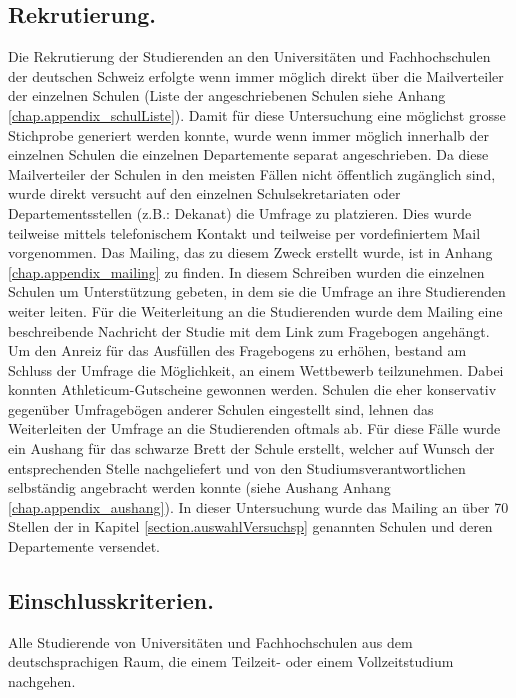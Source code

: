 \subsection{Rekrutierung.}\label{subsection.rekrutierung}
Die Rekrutierung der Studierenden an den Universitäten und Fachhochschulen der deutschen Schweiz erfolgte wenn immer möglich direkt über die Mailverteiler der einzelnen Schulen (Liste der angeschriebenen Schulen siehe Anhang \ref{chap.appendix_schulListe}). Damit für diese Untersuchung eine möglichst grosse Stichprobe generiert werden konnte, wurde wenn immer möglich innerhalb der einzelnen Schulen die einzelnen Departemente separat angeschrieben. Da diese Mailverteiler der Schulen in den meisten Fällen nicht öffentlich zugänglich sind, wurde direkt versucht auf den einzelnen Schulsekretariaten oder Departementsstellen (z.B.: Dekanat) die Umfrage zu platzieren. Dies wurde teilweise mittels telefonischem Kontakt und teilweise per vordefiniertem Mail vorgenommen. Das Mailing, das zu diesem Zweck erstellt wurde, ist in Anhang \ref{chap.appendix_mailing} zu finden. In diesem Schreiben wurden die einzelnen Schulen um Unterstützung gebeten, in dem sie die Umfrage an ihre Studierenden weiter leiten. Für die Weiterleitung an die Studierenden wurde dem Mailing eine beschreibende Nachricht der Studie mit dem Link zum Fragebogen angehängt. Um den Anreiz für das Ausfüllen des Fragebogens zu erhöhen, bestand am Schluss der Umfrage die Möglichkeit, an einem Wettbewerb teilzunehmen. Dabei konnten Athleticum-Gutscheine gewonnen werden. Schulen die eher konservativ gegenüber Umfragebögen anderer Schulen eingestellt sind, lehnen das Weiterleiten der Umfrage an die Studierenden oftmals ab. Für diese Fälle wurde ein Aushang für das schwarze Brett der Schule erstellt, welcher auf Wunsch der entsprechenden Stelle nachgeliefert und von den Studiumsverantwortlichen selbständig angebracht werden konnte (siehe Aushang Anhang \ref{chap.appendix_aushang}). In dieser Untersuchung wurde das Mailing an über 70 Stellen der in Kapitel \ref{section.auswahlVersuchsp} genannten Schulen und deren Departemente versendet.

\subsection{Einschlusskriterien.}\label{subsection.einschlusskriterien}
Alle Studierende von Universitäten und Fachhochschulen aus dem deutschsprachigen Raum, die einem Teilzeit- oder einem Vollzeitstudium nachgehen.

